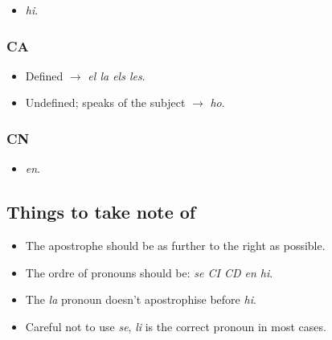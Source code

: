 \documentclass{article}
\begin{document}
\begin{itemize}
    \item \emph{hi}.
\end{itemize}

\subsubsection*{CA}

\begin{itemize}
    \item Defined $\rightarrow$ \emph{el la els les}.
    \item Undefined; speaks of the subject $\rightarrow$ \emph{ho}.
\end{itemize}

\subsubsection*{CN}

\begin{itemize}
    \item \emph{en}.
\end{itemize}

\subsection*{Things to take note of}

\begin{itemize}
    \item The apostrophe should be as further to the right as possible.
    \item The ordre of pronouns should be: \emph{se CI CD en hi}.
    \item The \emph{la} pronoun doesn't apostrophise before \emph{hi}.
    \item Careful not to use \emph{se}, \emph{li} is the correct pronoun in most
    cases.
\end{itemize}
\end{document}
